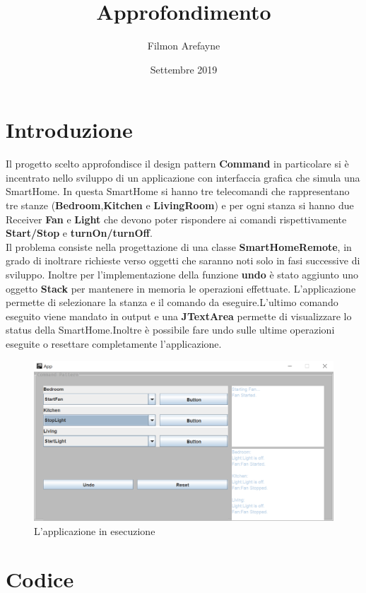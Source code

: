 \documentclass{article}
\title{Approfondimento}
\author{Filmon Arefayne}
\date{Settembre 2019}
\begin{document}
\maketitle

\section{Introduzione}

Il progetto scelto approfondisce il design pattern \textbf{Command} in particolare si è incentrato nello sviluppo di un applicazione con interfaccia grafica che simula una SmartHome. In questa SmartHome si hanno tre telecomandi che rappresentano tre stanze (\textbf{Bedroom},\textbf{Kitchen} e \textbf{LivingRoom}) e per ogni stanza si hanno due Receiver  \textbf{Fan} e \textbf{Light} che devono poter rispondere ai comandi rispettivamente \textbf{Start/Stop} e \textbf{turnOn/turnOff}.
\\
Il problema consiste nella progettazione di una classe \textbf{SmartHomeRemote}, in grado di inoltrare richieste verso oggetti che saranno noti solo in fasi successive di sviluppo. Inoltre per l'implementazione della funzione \textbf{undo} è stato aggiunto uno oggetto \textbf{Stack} per mantenere in memoria le operazioni effettuate.
L'applicazione permette di selezionare la stanza e il comando da eseguire.L'ultimo comando eseguito viene mandato in output e una \textbf{JTextArea} permette di visualizzare lo status della SmartHome.Inoltre è possibile fare undo sulle ultime operazioni eseguite o resettare completamente l'applicazione.
\begin{figure}[ht]
\caption{L'applicazione in esecuzione}
\centering
\includegraphics[width=\textwidth]{images/Approfondimento1.PNG}
\end{figure}

\section{Codice}
\end{document}
